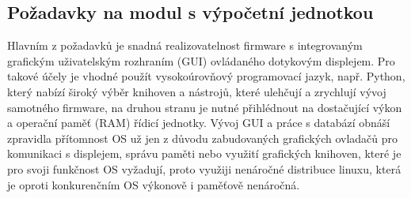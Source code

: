 
\subsection{Požadavky na modul s výpočetní jednotkou} %

%

Hlavním z požadavků je snadná realizovatelnost firmware s integrovaným grafickým uživatelským rozhraním (GUI) ovládaného dotykovým displejem. Pro takové účely je vhodné použít vysokoúrovňový programovací jazyk, např. Python, který nabízí široký výběr knihoven a nástrojů, které ulehčují a zrychlují vývoj samotného firmware, na druhou stranu je nutné přihlédnout na dostačující výkon a operační paměť (RAM) řídicí jednotky. Vývoj GUI a práce s databází obnáší zpravidla přítomnost OS už jen z důvodu zabudovaných grafických ovladačů pro komunikaci s displejem, správu paměti nebo využití grafických knihoven, které je pro svoji funkčnost OS vyžadují, proto využiji nenáročné distribuce linuxu, která je oproti konkurenčním OS výkonově i paměťově nenáročná.


